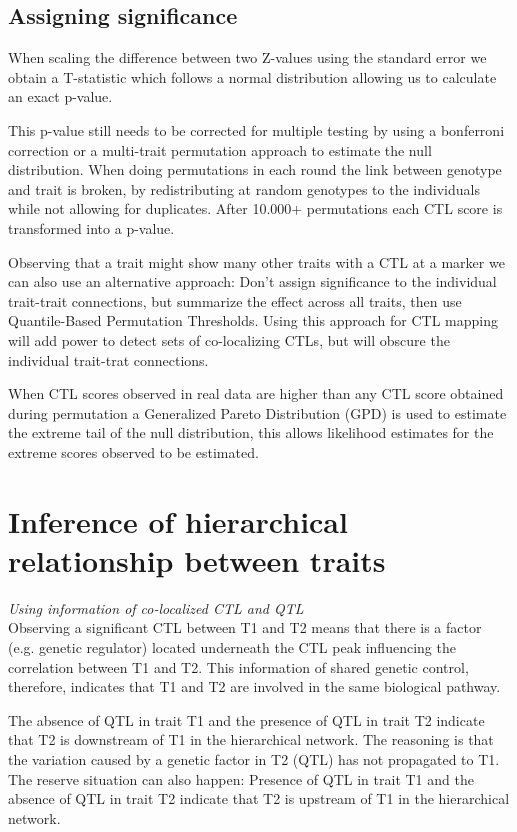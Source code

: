   \subsection{Assigning significance}
  
  When scaling the difference between two Z-values using the standard error we obtain a T-statistic which follows a 
  normal distribution\cite{Biometry:1995} allowing us to calculate an exact p-value.

  This p-value still needs to be corrected for multiple testing by using a bonferroni correction or a multi-trait 
  permutation approach\cite{Breitling:2008} to estimate the null distribution. When doing permutations in each round 
  the link between genotype and trait is broken, by redistributing at random genotypes to the individuals while not 
  allowing for duplicates. After 10.000+ permutations each CTL score is transformed into a p-value.

  Observing that a trait might show many other traits with a CTL at a marker we can also use an alternative approach: 
  Don't assign significance to the individual trait-trait connections, but summarize the effect across all traits, 
  then use Quantile-Based Permutation Thresholds\cite{Neto:2012}. Using this approach for CTL mapping will add power 
  to detect sets of co-localizing CTLs, but will obscure the individual trait-trat connections.

  When CTL scores observed in real data are higher than any CTL score obtained during permutation a Generalized 
  Pareto Distribution (GPD) is used to estimate the extreme tail of the null distribution\cite{Knijnenburg:2009}, 
  this allows likelihood estimates for the extreme scores observed to be estimated.

\section{Inference of hierarchical relationship between traits}
  \emph{Using information of co-localized CTL and QTL}\\
  Observing a significant CTL between T1 and T2 means that there is a factor (e.g. genetic regulator) located underneath 
  the CTL peak influencing the correlation between T1 and T2. This information of shared genetic control, therefore, 
  indicates that T1 and T2 are involved in the same biological pathway\cite{Tesson:2010}.

  The absence of QTL in trait T1 and the presence of QTL in trait T2 indicate that T2 is downstream of T1 in the 
  hierarchical network. The reasoning is that the variation caused by a genetic factor in T2 (QTL) has not 
  propagated to T1\cite{Jansen:2009}. The reserve situation can also happen: Presence of QTL in trait T1 and the 
  absence of QTL in trait T2 indicate that T2 is upstream of T1 in the hierarchical network.

